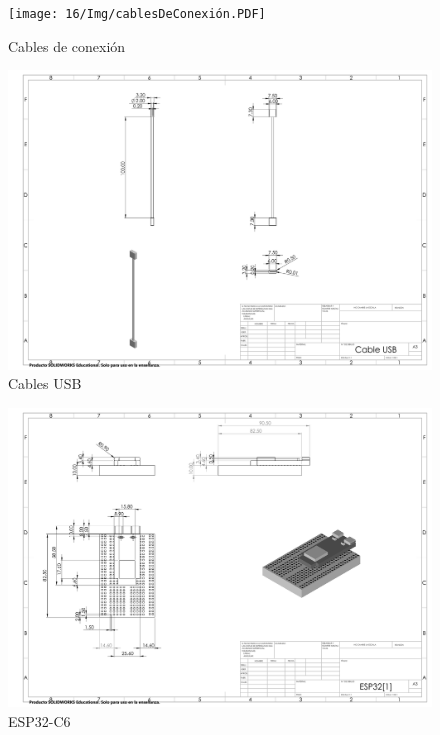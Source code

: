     \begin{figure}[H]
        \centering
        \texttt{[image: 16/Img/cablesDeConexión.PDF]}
        \caption{Cables de conexión}
        \label{fig:Cables de conexión}
    \end{figure}
    \begin{figure}[H]
        \centering
        \includegraphics[trim = {10mm 10mm 10mm 10mm},clip,scale=0.150]{16/Img/cableUSB.PDF}
        \caption{Cables USB}
        \label{fig:Cable USB}
    \end{figure}
    \begin{figure}[H]
        \centering
        \includegraphics[trim = {10mm 10mm 10mm 10mm},clip,scale=0.150]{16/Img/eSP32.PDF}
        \caption{ESP32-C6}
        \label{fig:ESP32-C6}
    \end{figure}
